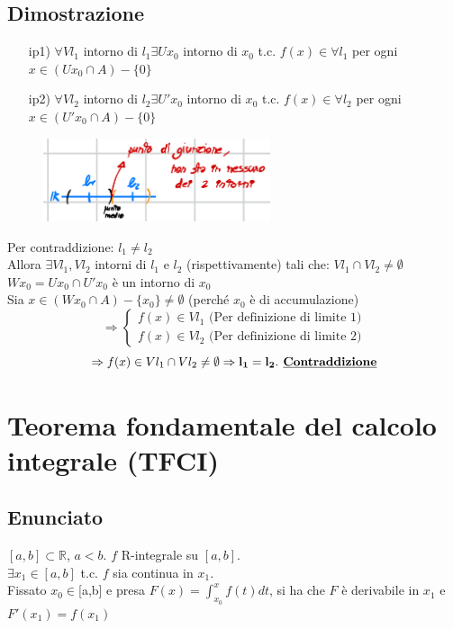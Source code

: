 \documentclass{article}
\newcommand{\R}{\mathbb{R}}
\begin{document}
\begin{flushleft}
\subsection{Dimostrazione}

\begin{enumerate}
    \item[ip1)] $\forall V l_1 $ intorno di $l_1 \exists U x_0$ intorno di $x_0$ t.c. $f(x)\in\forall l_1 $ per ogni $x\in (U x_0 \cap A) - \{0\}$
    \item[ip2)] $\forall V l_2 $ intorno di $l_2 \exists U' x_0$ intorno di $x_0$ t.c. $f(x)\in\forall l_2 $ per ogni $x\in (U' x_0 \cap A) - \{0\}$
\end{enumerate}

\begin{figure}[h]
    \centering
    \includegraphics[width=18em]{./images/unicitaLimite.PNG}
\end{figure}

Per contraddizione: $l_1 \neq l_2$
\\Allora $\exists Vl_1, Vl_2$ intorni di $l_1$ e $l_2$ (rispettivamente) tali che: $Vl_1 \cap Vl_2 \neq \emptyset$
\\$Wx_0 = U x_0 \cap U'x_0$ è un intorno di $x_0$
\\Sia $x \in(Wx_0 \cap A) - \{x_0\} \neq \emptyset$ (perché $x_0$ è di accumulazione)
\[
    \Rightarrow
    \begin{cases}
        f(x) \in Vl_1 \text{  (Per definizione di limite 1)}\\
        f(x) \in Vl_2 \text{  (Per definizione di limite 2)}
    \end{cases}
\]
\[
    \Rightarrow f(x) \in Vl_1 \cap Vl_2 \neq \emptyset \Rightarrow \mathbf{l_1 = l_2}. \mathbf{\textbf{ \underline{Contraddizione}}}
\]
\newpage
\section{Teorema fondamentale del calcolo integrale (TFCI)} \label{TFCI}
\subsection{Enunciato}
$[a,b] \subset \R$, $a < b$. $f$ R-integrale su $[a,b]$.
\\$\exists x_1 \in [a,b]$ t.c. $f$ sia continua in $x_1$.
\\Fissato $x_0 \in $[a,b] e presa $F(x) = \int_{x_0}^{x}f(t)dt$, si ha che $F$ è derivabile in $x_1$ e $F'(x_1)=f(x_1)$

\end{flushleft}
\end{document}
